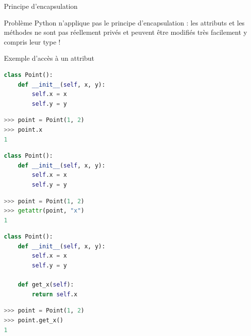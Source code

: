 \documentclass[10pt]{beamer}
\begin{document}
\begin{frame}{Principe d'encapsulation}

  \begin{block}{Problème}
    \medskip
    Python n'applique pas le principe d'encapsulation : les attributs et les méthodes ne sont pas réellement privés et peuvent être modifiés très facilement y compris leur type !
  \end{block}
\end{frame}

\begin{frame}[fragile]{Exemple d'accès à un attribut}

\begin{overprint}

\begin{lstlisting}[language=Python, numbers=none]
class Point():
    def __init__(self, x, y):
        self.x = x
        self.y = y
\end{lstlisting}

\begin{lstlisting}[language=Python, numbers=none]
>>> point = Point(1, 2)
>>> point.x
1
\end{lstlisting}

\begin{lstlisting}[language=Python, numbers=none]
class Point():
    def __init__(self, x, y):
        self.x = x
        self.y = y
\end{lstlisting}

\begin{lstlisting}[language=Python, numbers=none]
>>> point = Point(1, 2)
>>> getattr(point, "x")
1
\end{lstlisting}


\begin{lstlisting}[language=Python, numbers=none]
class Point():
    def __init__(self, x, y):
        self.x = x
        self.y = y

    def get_x(self):
        return self.x
\end{lstlisting}

\begin{lstlisting}[language=Python, numbers=none]
>>> point = Point(1, 2)
>>> point.get_x()
1
\end{lstlisting}

\end{overprint}

\end{frame}
\end{document}
